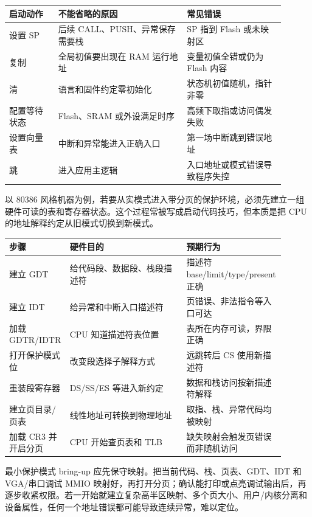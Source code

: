 \begin{longtable}{L{0.16\linewidth}L{0.42\linewidth}L{0.32\linewidth}}
\toprule
启动动作 & 不能省略的原因 & 常见错误 \\
\midrule
设置 SP & 后续 CALL、PUSH、异常保存需要栈 & SP 指到 Flash 或未映射区 \\\tablerowrule
复制  & 全局初值要出现在 RAM 运行地址 & 变量初值全错或仍为 Flash 内容 \\\tablerowrule
清  & 语言和固件约定零初始化 & 状态机初值随机，指针非零 \\\tablerowrule
配置等待状态 & Flash、SRAM 或外设满足时序 & 高频下取指或访问偶发失败 \\\tablerowrule
设置向量表 & 中断和异常能进入正确入口 & 第一场中断跳到错误地址 \\\tablerowrule
跳  & 进入应用主逻辑 & 入口地址或模式错误导致程序失控 \\
\bottomrule
\end{longtable}

以 80386 风格机器为例，若要从实模式进入带分页的保护环境，必须先建立一组硬件可读的表和寄存器状态。这个过程常被写成启动代码技巧，但本质是把 CPU 的地址解释约定从旧模式切换到新模式。

\begin{longtable}{L{0.16\linewidth}L{0.42\linewidth}L{0.32\linewidth}}
\toprule
步骤 & 硬件目的 & 预期行为 \\
\midrule
建立 GDT & 给代码段、数据段、栈段描述符 & 描述符 base/limit/type/present 正确 \\\tablerowrule
建立 IDT & 给异常和中断入口描述符 & 页错误、非法指令等入口可达 \\\tablerowrule
加载 GDTR/IDTR & CPU 知道描述符表位置 & 表所在内存可读，界限正确 \\\tablerowrule
打开保护模式位 & 改变段选择子解释方式 & 远跳转后 CS 使用新描述符 \\\tablerowrule
重装段寄存器 & DS/SS/ES 等进入新约定 & 数据和栈访问按新描述符解释 \\\tablerowrule
建立页目录/页表 & 线性地址可转换到物理地址 & 取指、栈、异常代码均被映射 \\\tablerowrule
加载 CR3 并开启分页 & CPU 开始查页表和 TLB & 缺失映射会触发页错误而非随机访问 \\
\bottomrule
\end{longtable}

最小保护模式 bring-up 应先保守映射。把当前代码、栈、页表、GDT、IDT 和 VGA/串口调试 MMIO 映射好，再打开分页；确认能打印或点亮调试输出后，再逐步收紧权限。若一开始就建立复杂高半区映射、多个页大小、用户/内核分离和设备属性，任何一个地址错误都可能导致连续异常，难以定位。

